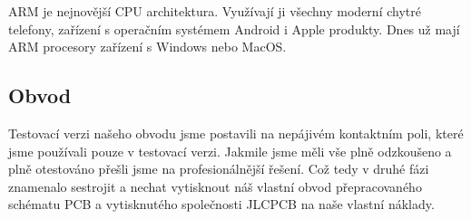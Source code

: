 \documentclass[12pt,a4paper]{article}
\begin{document}
ARM je nejnovější CPU architektura. Využívají ji všechny moderní chytré telefony, zařízení s operačním systémem Android i Apple produkty. Dnes už mají ARM procesory zařízení s Windows nebo MacOS.


\subsection{Obvod}

Testovací verzi našeho obvodu jsme postavili na nepájivém kontaktním poli,
které jsme používali pouze v testovací verzi. Jakmile jsme měli vše plně
odzkoušeno a plně otestováno přešli jsme na profesionálnější řešení.
Což tedy v druhé fázi znamenalo sestrojit a nechat vytisknout náš vlastní obvod
přepracovaného schématu PCB a vytisknutého společnosti JLCPCB na naše vlastní
náklady.
\end{document}
